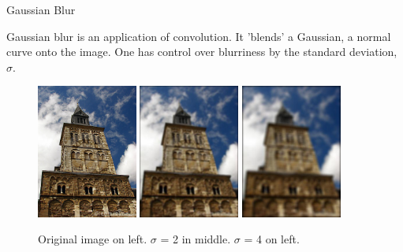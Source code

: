 \documentclass{beamer}
\begin{document}
\begin{frame}{Gaussian Blur}

Gaussian blur is an application of  convolution. It 'blends' a Gaussian, a normal curve onto the image. One has control over blurriness by the standard deviation, $\sigma$.


\begin{figure}[ht]
\includegraphics[width=1.3in]{churchin.jpg}
\hspace{.1in}
\includegraphics[width=1.3in]{churchoutblur.jpg}
\hspace{.1in}
\includegraphics[width=1.3in]{churchoutblur2.jpg}
\caption{Original image on left. $\sigma$ = 2 in middle. $\sigma$ = 4 on left.}
\end{figure}
\end{frame}
\end{document}
